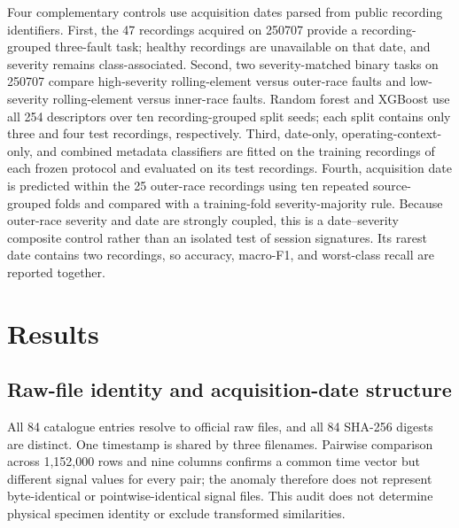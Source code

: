 \documentclass[11pt]{article}
\begin{document}
Four complementary controls use acquisition dates parsed from public recording identifiers. First, the 47 recordings acquired on 250707 provide a recording-grouped three-fault task; healthy recordings are unavailable on that date, and severity remains class-associated. Second, two severity-matched binary tasks on 250707 compare high-severity rolling-element versus outer-race faults and low-severity rolling-element versus inner-race faults. Random forest and XGBoost use all 254 descriptors over ten recording-grouped split seeds; each split contains only three and four test recordings, respectively. Third, date-only, operating-context-only, and combined metadata classifiers are fitted on the training recordings of each frozen protocol and evaluated on its test recordings. Fourth, acquisition date is predicted within the 25 outer-race recordings using ten repeated source-grouped folds and compared with a training-fold severity-majority rule. Because outer-race severity and date are strongly coupled, this is a date--severity composite control rather than an isolated test of session signatures. Its rarest date contains two recordings, so accuracy, macro-F1, and worst-class recall are reported together.

\section{Results}
\subsection{Raw-file identity and acquisition-date structure}
All 84 catalogue entries resolve to official raw files, and all 84 SHA-256 digests are distinct. One timestamp is shared by three filenames. Pairwise comparison across 1,152,000 rows and nine columns confirms a common time vector but different signal values for every pair; the anomaly therefore does not represent byte-identical or pointwise-identical signal files. This audit does not determine physical specimen identity or exclude transformed similarities.
\end{document}
